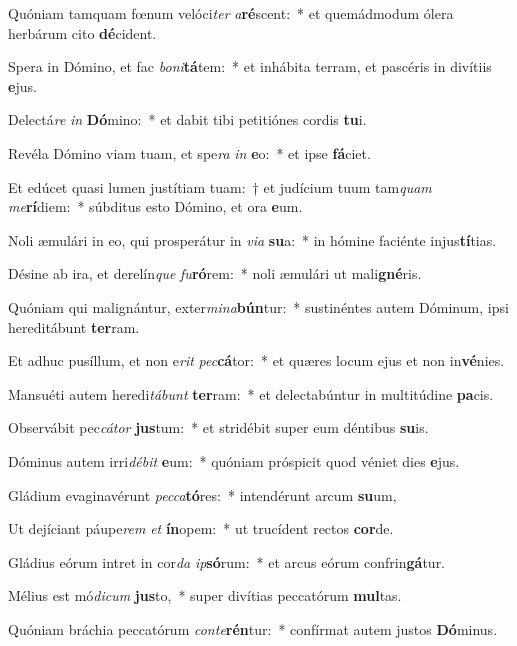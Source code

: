 \item Quóniam tamquam fœnum velóci\textit{ter} \textit{a}\textbf{ré}scent:~* et quemádmodum ólera herbárum cito \textbf{dé}cident.
\item Spera in Dómino, et fac \textit{bo}\textit{ni}\textbf{tá}tem:~* et inhábita terram, et pascéris in divítiis \textbf{e}jus.
\item Delectá\textit{re} \textit{in} \textbf{Dó}mino:~* et dabit tibi petitiónes cordis \textbf{tu}i.
\item Revéla Dómino viam tuam, et spe\textit{ra} \textit{in} \textbf{e}o:~* et ipse \textbf{fá}ciet.
\item Et edúcet quasi lumen justítiam tuam:~† et judícium tuum tam\textit{quam} \textit{me}\textbf{rí}diem:~* súbditus esto Dómino, et ora \textbf{e}um.
\item Noli æmulári in eo, qui prosperátur in \textit{vi}\textit{a} \textbf{su}a:~* in hómine faciénte injus\textbf{tí}tias.
\item Désine ab ira, et derelín\textit{que} \textit{fu}\textbf{ró}rem:~* noli æmulári ut mali\textbf{gné}ris.
\item Quóniam qui malignántur, exter\textit{mi}\textit{na}\textbf{bún}tur:~* sustinéntes autem Dóminum, ipsi hereditábunt \textbf{ter}ram.
\item Et adhuc pusíllum, et non e\textit{rit} \textit{pec}\textbf{cá}tor:~* et quæres locum ejus et non in\textbf{vé}nies.
\item Mansuéti autem heredi\textit{tá}\textit{bunt} \textbf{ter}ram:~* et delectabúntur in multitúdine \textbf{pa}cis.
\item Observábit pec\textit{cá}\textit{tor} \textbf{jus}tum:~* et stridébit super eum déntibus \textbf{su}is.
\item Dóminus autem irri\textit{dé}\textit{bit} \textbf{e}um:~* quóniam próspicit quod véniet dies \textbf{e}jus.
\item Gládium evaginavérunt \textit{pec}\textit{ca}\textbf{tó}res:~* intendérunt arcum \textbf{su}um,
\item Ut dejíciant páupe\textit{rem} \textit{et} \textbf{ín}opem:~* ut trucídent rectos \textbf{cor}de.
\item Gládius eórum intret in cor\textit{da} \textit{ip}\textbf{só}rum:~* et arcus eórum confrin\textbf{gá}tur.
\item Mélius est mó\textit{di}\textit{cum} \textbf{jus}to,~* super divítias peccatórum \textbf{mul}tas.
\item Quóniam bráchia peccatórum \textit{con}\textit{te}\textbf{rén}tur:~* confírmat autem justos \textbf{Dó}minus.
